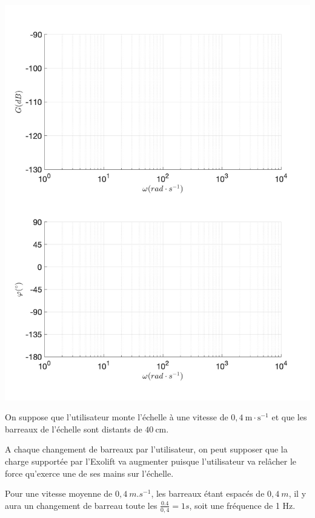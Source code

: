  {
  \begin{center}
 \includegraphics[width=1.0\textwidth]{images/bode_total0}
 \end{center}
 }

\else

On suppose que l'utilisateur monte l'échelle à une vitesse de $0,4 \mathrm{~m} \cdot \mathrm{s}^{-1}$ et que les barreaux de l'échelle sont distants de $40 \mathrm{~cm}$.

\fi


\ifprof
\begin{texteCache}

 A chaque changement de barreaux par l'utilisateur, on peut supposer
  que la charge supportée par l'Exolift va augmenter puisque
  l'utilisateur va relâcher le force qu'exerce une de ses mains sur
  l'échelle.

  Pour une vitesse moyenne de \(0,4\ m.s^{- 1}\), les barreaux étant
  espacés de \(0,4\ m\), il y aura un changement de barreau toute les
  \(\frac{0.4}{0,4} = 1s\), soit une fréquence de 1 Hz.

 
 \vspace{1.5cm}

\end{texteCache}
\else


